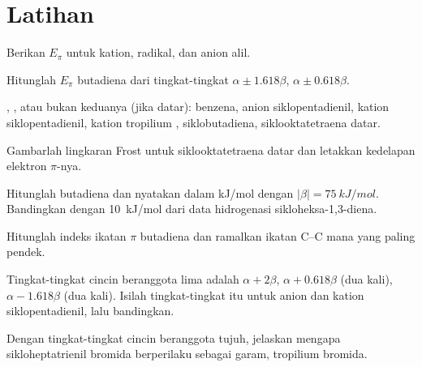 \section{Latihan}

\begin{exercise}[$\star$]\label{exo:b2:huckel:1}
Berikan $E_\pi$ untuk kation, radikal, dan anion alil.
\end{exercise}

\begin{exercise}[$\star$]\label{exo:b2:huckel:2}
Hitunglah $E_\pi$ butadiena dari tingkat-tingkat $\alpha \pm 1.618\beta$, $\alpha \pm 0.618\beta$.
\end{exercise}

\begin{exercise}[$\star$]\label{exo:b2:huckel:3}
, , atau bukan keduanya (jika datar): benzena, anion
siklopentadienil, kation siklopentadienil, kation tropilium ,
siklobutadiena, siklooktatetraena datar.
\end{exercise}

\begin{exercise}[$\star$]\label{exo:b2:huckel:4}
Gambarlah lingkaran Frost untuk siklooktatetraena datar dan letakkan kedelapan elektron $\pi$-nya.
\end{exercise}

\begin{exercise}[$\star\star$]\label{exo:b2:huckel:5}
Hitunglah  butadiena dan nyatakan dalam \unit{kJ/mol}
dengan $|\beta| = \qty{75}{kJ/mol}$. Bandingkan dengan \qty{10}{kJ/mol} dari
data hidrogenasi sikloheksa-1,3-diena.
\end{exercise}

\begin{exercise}[$\star\star$]\label{exo:b2:huckel:6}
Hitunglah indeks ikatan $\pi$ butadiena dan ramalkan ikatan C--C mana yang
paling pendek.
\end{exercise}

\begin{exercise}[$\star\star$]\label{exo:b2:huckel:7}
Tingkat-tingkat cincin beranggota lima adalah $\alpha + 2\beta$,
$\alpha + 0.618\beta$ (dua kali), $\alpha - 1.618\beta$ (dua kali). Isilah
tingkat-tingkat itu untuk anion dan kation siklopentadienil, lalu
bandingkan.
\end{exercise}

\begin{exercise}[$\star\star$]\label{exo:b2:huckel:8}
Dengan tingkat-tingkat cincin beranggota tujuh, jelaskan mengapa
sikloheptatrienil bromida berperilaku sebagai garam, tropilium bromida.
\end{exercise}

